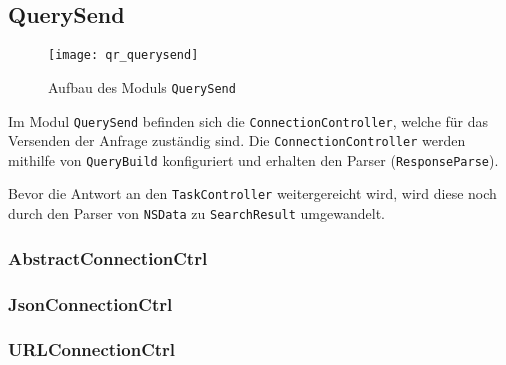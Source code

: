 
\subsection{QuerySend}

\begin{figure}[htb]
  	\texttt{[image: qr\_querysend]}
  	\caption{Aufbau des Moduls \lstinline|QuerySend|}
	\label{fig:Aufbau des Moduls \lstinline|QuerySend|}
\end{figure}

Im Modul \lstinline|QuerySend| befinden sich die \lstinline|ConnectionController|, welche für das Versenden der Anfrage zuständig sind. Die \lstinline|ConnectionController| werden mithilfe von \lstinline|QueryBuild| konfiguriert und erhalten den Parser (\lstinline|ResponseParse|).

Bevor die Antwort an den \lstinline|TaskController| weitergereicht wird, wird diese noch durch den Parser von \lstinline|NSData| zu \lstinline|SearchResult| umgewandelt.

\subsubsection{AbstractConnectionCtrl}
\subsubsection{JsonConnectionCtrl}
\subsubsection{URLConnectionCtrl}

